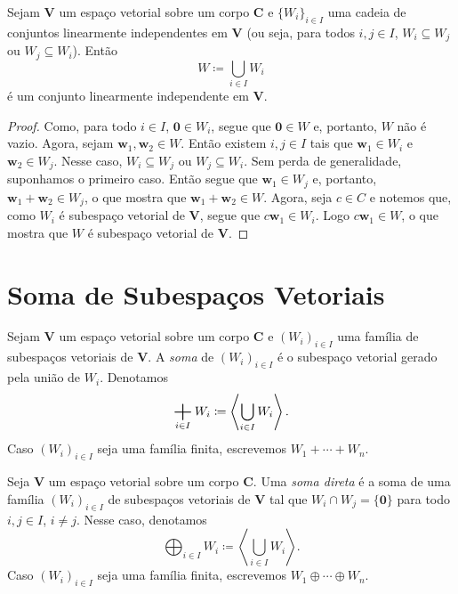 \begin{prop}
	Sejam $\bm V$ um espaço vetorial sobre um corpo $\bm C$ e $\{W_i\}_{i \in I}$ uma cadeia de conjuntos linearmente independentes em $\bm V$ (ou seja, para todos $i,j \in I$, $W_i \subseteq W_j$ ou $W_j \subseteq W_i$). Então
	\begin{equation*}
	W \coloneqq \bigcup_{i \in I} W_i
	\end{equation*}
é um conjunto linearmente independente em $\bm V$.
\end{prop}
\begin{proof}
	Como, para todo $i \in I$, $\bm 0 \in W_i$, segue que $\bm 0 \in W$ e, portanto, $W$ não é vazio. Agora, sejam $\bm w_1,\bm w_2 \in W$. Então existem $i,j \in I$ tais que $\bm w_1 \in W_i$ e $\bm w_2 \in W_j$. Nesse caso, $W_i \subseteq W_j$ ou $W_j \subseteq W_i$. Sem perda de generalidade, suponhamos o primeiro caso. Então segue que $\bm w_1 \in W_j$ e, portanto, $\bm w_1+\bm w_2 \in W_j$, o que mostra que $\bm w_1+\bm w_2 \in W$. Agora, seja $c \in C$ e notemos que, como $W_i$ é subespaço vetorial de $\bm V$, segue que $c\bm w_1 \in W_i$. Logo $c\bm w_1 \in W$, o que mostra que $W$ é subespaço vetorial de $\bm V$.
\end{proof}


\section{Soma de Subespaços Vetoriais}

\begin{defi}
	Sejam $\bm V$ um espaço vetorial sobre um corpo $\bm C$ e $(W_i)_{i \in I}$ uma família de subespaços vetoriais de $\bm V$. A \emph{soma} de $(W_i)_{i \in I}$ é o subespaço vetorial gerado pela união de $W_i$. Denotamos
	\begin{equation*}
	\bigsum_{i \in I} W_i \coloneqq \left\langle \bigcup_{i \in I} W_i \right\rangle.
	\end{equation*}
Caso $(W_i)_{i \in I}$ seja uma família finita, escrevemos $W_1 + \cdots + W_n$.
\end{defi}

\begin{defi}
	Seja $\bm V$ um espaço vetorial sobre um corpo $\bm C$. Uma \emph{soma direta} é a soma de uma família $(W_i)_{i \in I}$ de subespaços vetoriais de $\bm V$ tal que $W_i \cap W_j = \{\bm 0\}$ para todo $i,j \in I$, $i \neq j$. Nesse caso, denotamos
	\begin{equation*}
	\bigoplus_{i \in I} W_i \coloneqq \left\langle \bigcup_{i \in I} W_i\right\rangle.
	\end{equation*}
Caso $(W_i)_{i \in I}$ seja uma família finita, escrevemos $W_1 \oplus \cdots \oplus W_n$.
\end{defi}

